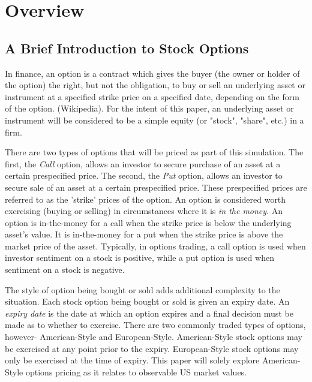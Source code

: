 
\chapter{Overview}
\section{A Brief Introduction to Stock Options} %

In finance, an option is a contract which gives the buyer (the owner or holder of the option) the right, but not the obligation, to buy or sell an underlying asset or instrument at a specified strike price on a specified date, depending on the form of the option. (Wikipedia)\cite{Ancey1996}. For the intent of this paper, an underlying asset or instrument will be considered to be a simple equity (or "stock", "share", etc.) in a firm. 

There are two types of options that will be priced as part of this simulation. The first, the \textit{Call} option, allows an investor to secure purchase of an asset at a certain prespecified price. The second, the \textit{Put} option, allows an investor to secure sale of an asset at a certain prespecified price. These prespecified prices are referred to as the 'strike' prices of the option. An option is considered worth exercising (buying or selling) in circumstances where it is \textit{in the money}. An option is in-the-money for a call when the strike price is below the underlying asset's value. It is in-the-money for a put when the strike price is above the market price of the asset. Typically, in options trading, a call option is used when investor sentiment on a stock is positive, while a put option is used when sentiment on a stock is negative. 

The style of option being bought or sold adds additional complexity to the situation. Each stock option being bought or sold is given an expiry date. An \textit{expiry date} is the date at which an option expires and a final decision must be made as to whether to exercise. There are two commonly traded types of options, however- American-Style and European-Style. American-Style stock options may be exercised at any point prior to the expiry. European-Style stock options may only be exercised at the time of expiry. This paper will solely explore American-Style options pricing as it relates to observable US market values.

